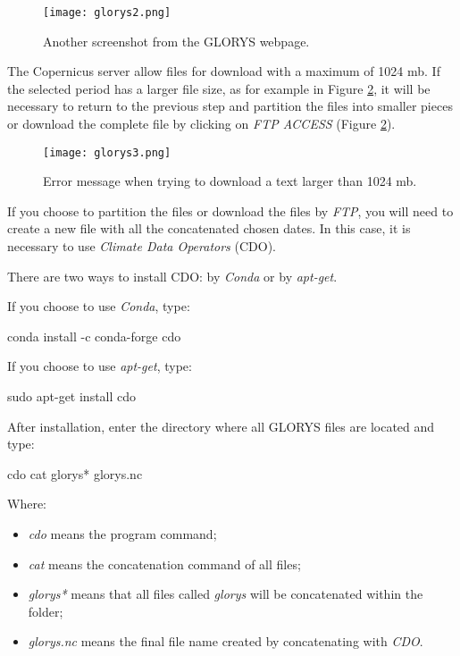 \begin{figure}[H]
    \centering
    \texttt{[image: glorys2.png]}
    \caption{Another screenshot from the GLORYS webpage.}
    \label{glorys2}
\end{figure}
\bigskip

\noindent The Copernicus server allow files for download with a maximum of 1024 mb. 
If the selected period has a larger file size, as for example in Figure \textcolor{bleu_cite}{\ref{glorys3}}, it will be necessary to 
return to the previous step and partition the files into smaller pieces or download the complete file by clicking on \textit{FTP ACCESS}
(Figure \textcolor{bleu_cite}{\ref{glorys3}}).
\bigskip

\begin{figure}[H]
    \centering
    \texttt{[image: glorys3.png]}
    \caption{Error message when trying to download a text larger than 1024 mb.}
    \label{glorys3}
\end{figure}
\bigskip

\noindent If you choose to partition the files or download the files by \textit{FTP}, you will need to create a new file with 
all the concatenated chosen dates. In this case, it is necessary to use \textit{Climate Data Operators} (CDO).
\bigskip

\noindent There are two ways to install CDO: by \textit{Conda} or by \textit{apt-get}.
\bigskip

\noindent If you choose to use \textit{Conda}, type:
\bigskip

\begin{bashcode}
conda install -c conda-forge cdo
\end{bashcode}
\bigskip

\noindent If you choose to use \textit{apt-get}, type:
\bigskip

\begin{bashcode}
sudo apt-get install cdo
\end{bashcode}
\bigskip

\noindent After installation, enter the directory where all GLORYS files are located and type:
\bigskip

\begin{bashcode}
cdo cat glorys* glorys.nc
\end{bashcode}
\bigskip

\noindent Where: 
\bigskip

\begin{itemize}
    \item  \textit{cdo} means the program command;
    \item \textit{cat} means the concatenation command of all files;
    \item \textit{glorys*} means that all files called \textit{glorys} will be concatenated within the folder;
    \item \textit{glorys.nc} means the final file name created by concatenating with \textit{CDO}.
\end{itemize}
\bigskip

